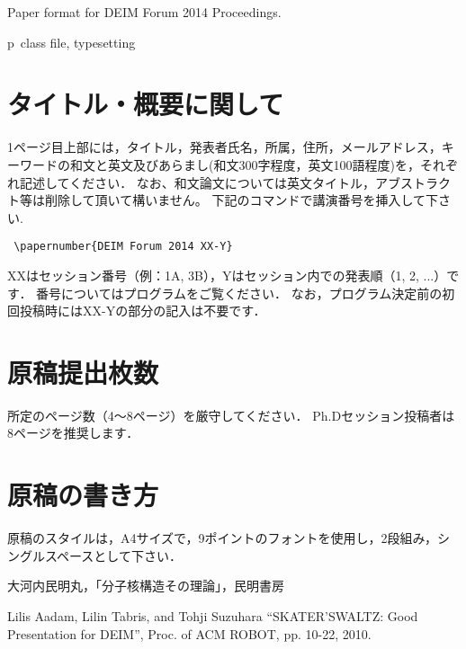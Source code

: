 \documentclass{deime}
\begin{document}
\pagestyle{empty}
\begin{eabstract}
Paper format for DEIM Forum 2014 Proceedings.
\end{eabstract}
\begin{ekeyword}
p\LaTeXe\ class file, typesetting
\end{ekeyword}
\maketitle

\section{タイトル・概要に関して}

1ページ目上部には，タイトル，発表者氏名，所属，住所，メールアドレス，キーワードの和文と英文及びあらまし(和文300字程度，英文100語程度)を，それぞれ記述してください．
なお、和文論文については英文タイトル，アブストラクト等は削除して頂いて構いません。
下記のコマンドで講演番号を挿入して下さい.
\begin{verbatim}
 \papernumber{DEIM Forum 2014 XX-Y}
\end{verbatim}
XXはセッション番号（例：1A, 3B），Yはセッション内での発表順（1, 2, ...）です．
番号についてはプログラムをご覧ください．
なお，プログラム決定前の初回投稿時にはXX-Yの部分の記入は不要です．

\section{原稿提出枚数}

所定のページ数（4～8ページ）を厳守してください．
Ph.Dセッション投稿者は8ページを推奨します．

\section{原稿の書き方}

原稿のスタイルは，A4サイズで，9ポイントのフォントを使用し，2段組み，シングルスペースとして下さい．

\vspace{30mm}

\begin{thebibliography}{99}
大河内民明丸，「分子核構造その理論」，民明書房

Lilis Aadam, Lilin Tabris, and Tohji Suzuhara ``SKATER'SWALTZ: Good Presentation for DEIM'', Proc. of ACM ROBOT, pp. 10-22, 2010.
\end{thebibliography}
\end{document}
